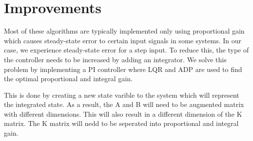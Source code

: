 \section{Improvements}
Most of these algorithms are typically implemented only using proportional gain which causes steady-state error to certain input signals in some systems.  In our case, we experience steady-state error for a step input.  To reduce this, the type of the controller needs to be increased by adding an integrator.  We solve this problem by implementing a PI controller where LQR and ADP are used to find the optimal proportional and integral gain.

This is done by creating a new state varible to the system which will represent the integrated state.   As a result, the A and B will need to be augmented matrix with different dimensions.  This will also result in a different dimension of the K matrix.  The K matrix will nedd to be seperated into proportional and integral gain.




